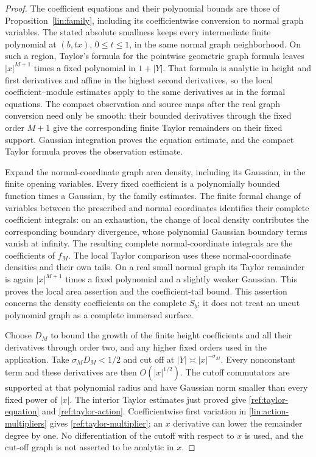 \begin{proof}
The coefficient equations and their polynomial bounds are those of
Proposition~\ref{lin:family}, including its coefficientwise conversion
to normal graph variables.  The stated absolute smallness keeps every
intermediate finite polynomial at $(b,tx)$, $0\le t\le1$, in the same
normal graph neighborhood.  On such a region, Taylor's formula
for the pointwise geometric graph formula leaves $|x|^{M+1}$ times a
fixed polynomial in $1+|Y|$.  That formula is analytic in height and
first derivatives and affine in the highest second derivatives, so the
local coefficient--module estimates apply to the same derivatives as
in the formal equations.  The compact observation and source maps after
the real graph conversion need only be smooth: their bounded derivatives
through the fixed order $M+1$ give the corresponding finite Taylor
remainders on their fixed support.  Gaussian integration proves the
equation estimate, and the compact Taylor formula proves the observation
estimate.

Expand the normal-coordinate graph area density, including its Gaussian,
in the finite opening variables.  Every fixed coefficient is a
polynomially bounded function times a Gaussian, by the family estimates.
The finite formal change of variables between the prescribed and normal
coordinates identifies their complete coefficient integrals: on an
exhaustion, the change of local density contributes the corresponding
boundary divergence, whose polynomial Gaussian boundary terms vanish
at infinity.  The resulting complete normal-coordinate integrals are
the coefficients of $f_M$.  The local Taylor comparison uses these
normal-coordinate densities and their own tails.  On a real small
normal graph its Taylor remainder is again $|x|^{M+1}$ times a fixed
polynomial and a slightly weaker Gaussian.  This proves the local
area assertion and the coefficient-tail bound.  This assertion concerns
the density coefficients on the complete $S_b$; it does not treat an
uncut polynomial graph as a complete immersed surface.

Choose $D_M$ to bound the growth of the finite height coefficients and
all their derivatives through order two, and any higher fixed orders
used in the application.  Take $\sigma_MD_M<1/2$ and cut off at
$|Y|\asymp |x|^{-\sigma_M}$.  Every nonconstant term and these
derivatives are then $O(|x|^{1/2})$.  The cutoff commutators are supported
at that polynomial radius and have Gaussian norm smaller than every
fixed power of $|x|$.  The interior Taylor estimates just proved give
\eqref{ref:taylor-equation} and \eqref{ref:taylor-action}.
Coefficientwise first variation in \eqref{lin:action-multipliers}
gives \eqref{ref:taylor-multiplier}; an $x$ derivative can lower the
remainder degree by one.  No differentiation of the cutoff with respect
to $x$ is used, and the cut-off graph is not asserted to be analytic in
$x$.
\end{proof}

